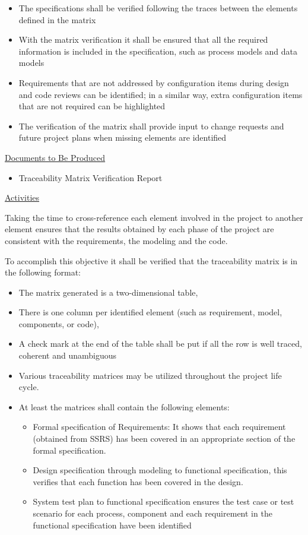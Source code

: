 \begin{itemize}
\item The specifications shall be verified following the traces
  between the elements defined in the matrix
\item With the matrix verification it shall be ensured that all the
  required information is included in the specification, such as
  process models and data models
\item Requirements that are not addressed by configuration items
  during design and code reviews can be identified; in a similar way,
  extra configuration items that are not required can be highlighted
\item The verification of the matrix shall provide input to change
  requests and future project plans when missing elements are
  identified
\end{itemize}

\underline{Documents to Be Produced} 

\begin{itemize}
\item Traceability Matrix Verification Report
\end{itemize}

\underline{Activities}

Taking the time to cross-reference each element involved in the
project to another element ensures that the results obtained by each
phase of the project are consistent with the requirements, the
modeling and the code.

To accomplish this objective it shall be verified that the
traceability matrix is in the following format:

\begin{itemize}

\item The matrix generated is a two-dimensional table,
\item There is one column per identified element (such as requirement,
model, components, or code),
\item A check mark at the end of the table shall be put if all the row
is well traced, coherent and unambiguous
\item Various traceability matrices may be utilized throughout the
project life cycle.  \item At least the matrices shall contain the
following elements:
\begin{itemize}
\item Formal specification of Requirements: It shows that each
requirement (obtained from SSRS) has been covered in an appropriate
section of the formal specification.
\item Design specification through modeling to functional
specification, this verifies that each function has been covered in
the design.
\item System test plan to functional specification ensures the test
case or test scenario for each process, component and each requirement
in the functional specification have been identified
\end{itemize}
\end{itemize}

